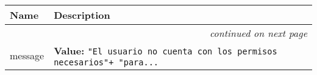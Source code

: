     \vspace{-1cm}
\hspace{\varindent}\begin{longtable}{|p{\varnamewidth}|p{\vardescrwidth}|l}
\cline{1-2}
\cline{1-2} \centering \textbf{Name} & \centering \textbf{Description}& \\
\cline{1-2}
\endhead\cline{1-2}\multicolumn{3}{r}{\small\textit{continued on next page}}\\\endfoot\cline{1-2}
\endlastfoot\raggedright m\-e\-s\-s\-a\-g\-e\- & \raggedright \textbf{Value:} 
{\tt "El usuario no cuenta con los permisos necesarios"+ "para\texttt{...}}&\\
\cline{1-2}
\end{longtable}

